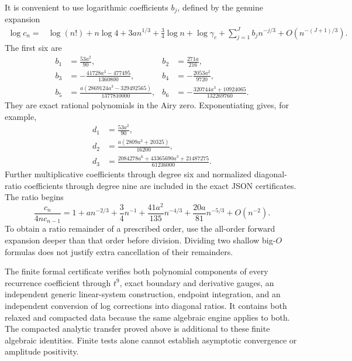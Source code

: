 \documentclass[11pt,letterpaper]{article}
\numberwithin{equation}{section}
\theoremstyle{remark}
\begin{document}
It is convenient to use logarithmic coefficients $b_j$, defined by the genuine expansion
\begin{align}
 \log c_n={}&\log(n!)+n\log4+3an^{1/3}+\tfrac34\log n+\log\gamma_c
       +\sum_{j=1}^Jb_jn^{-j/3}+O(n^{-(J+1)/3}).\label{air:jp:cb:eq:logexpansion}
\end{align}
The first six are
\begin{align*}
 b_1&=\frac{53a^2}{90},&
 b_2&=\frac{271a}{216},\\
 b_3&=-\frac{41728a^3-477495}{1360800},&
 b_4&=-\frac{2053a^2}{9720},\\
 b_5&=\frac{a(2869124a^3-329492565)}{1377810000},&
 b_6&=-\frac{320744a^3+10924065}{132269760}.
\end{align*}
They are exact rational polynomials in the Airy zero. Exponentiating gives, for example,
\begin{align*}
 d_1&=\frac{53a^2}{90},\\
 d_2&=\frac{a(2809a^3+20325)}{16200},\\
 d_3&=\frac{2084278a^6+43365690a^3+21487275}{61236000}.
\end{align*}
Further multiplicative coefficients through degree six and normalized diagonal-ratio coefficients through degree nine are included in the exact JSON certificates. The ratio begins
\[
 \frac{c_n}{4n c_{n-1}}=
 1+an^{-2/3}+\frac34n^{-1}+\frac{41a^2}{135}n^{-4/3}
  +\frac{20a}{81}n^{-5/3}+O(n^{-2}).
\]
To obtain a ratio remainder of a prescribed order, use the all-order forward expansion deeper than that order before division. Dividing two shallow big-$O$ formulas does not justify extra cancellation of their remainders.

The finite formal certificate verifies both polynomial components of every recurrence coefficient through $t^9$, exact boundary and derivative gauges, an independent generic linear-system construction, endpoint integration, and an independent conversion of log corrections into diagonal ratios. It contains both relaxed and compacted data because the same algebraic engine applies to both. The compacted analytic transfer proved above is additional to these finite algebraic identities. Finite tests alone cannot establish asymptotic convergence or amplitude positivity.
\end{document}
